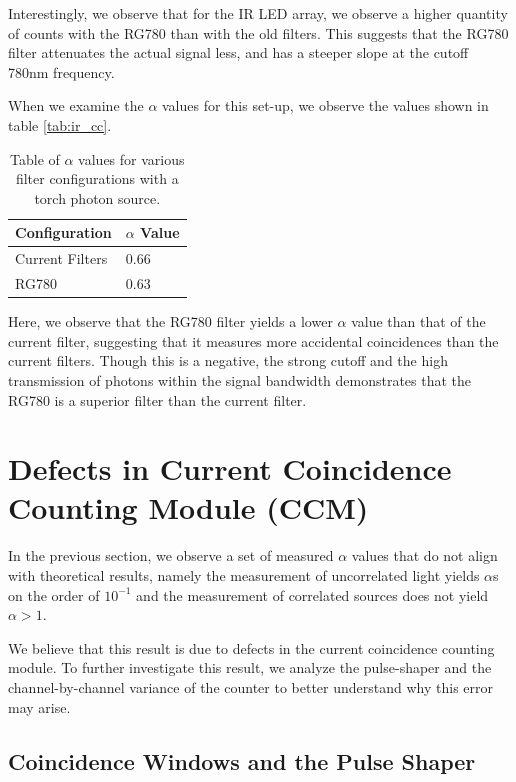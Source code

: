 \documentclass[letterpaper, 11 pt]{article}
\begin{document}
Interestingly, we observe that for the IR LED array, we observe a higher quantity of counts
with the RG780 than with the old filters. This suggests that the RG780 filter attenuates
the actual signal less, and has a steeper slope at the cutoff 780nm frequency. 

When we examine the $\alpha$ values for this set-up, we observe the values shown in
table \ref{tab:ir_cc}.
\begin{table}[H]
    \centering
    \begin{tabular}{|l|l|}
    \hline
    \textbf{Configuration} & \textbf{$\alpha$ Value} \\ \hline
    Current Filters        & 0.66                   \\ \hline
    RG780                  & 0.63                   \\ \hline
    \end{tabular}
    \caption{Table of $\alpha$ values for various filter configurations with a torch photon source.}
\end{table}\label{tab:ir_cc}

Here, we observe that the RG780 filter yields a lower $\alpha$ value than that of the 
current filter, suggesting that it measures more accidental coincidences than the
current filters. Though this is a negative, the strong cutoff and the high transmission of
photons within the signal bandwidth demonstrates that the RG780 is a superior filter than the current filter.

\section{Defects in Current Coincidence Counting Module (CCM)} \label{sec:ccm_broke}

In the previous section, we observe a set of measured $\alpha$ values that do not align with
theoretical results, namely the measurement of uncorrelated light yields $\alpha$s on the order of $10^{-1}$
and the measurement of correlated sources does not yield $\alpha > 1$.

We believe that this result is due to defects in the current coincidence counting module. To further
investigate this result, we analyze the pulse-shaper and the channel-by-channel variance of the counter
to better understand why this error may arise.

\subsection{Coincidence Windows and the Pulse Shaper}
\end{document}
